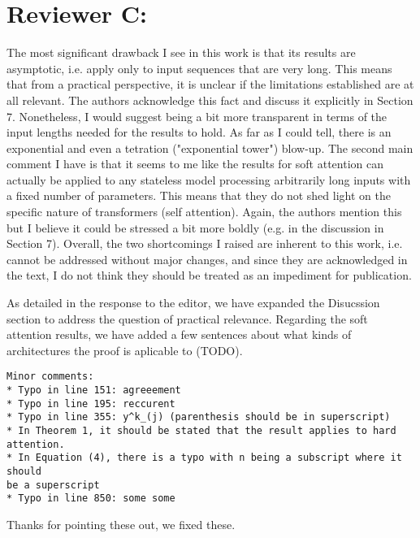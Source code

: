 \documentclass[11pt,a4paper]{article}
\newcommand\response[1]{{\color{blue}#1}}
\begin{document}
\section{Reviewer C:}

The most significant drawback I see in this work is that its results are
asymptotic, i.e. apply only to input sequences that are very long.  This
means that from a practical perspective, it is unclear if the limitations
established are at all relevant.  The authors acknowledge this fact and
discuss it explicitly in Section 7.  Nonetheless, I would suggest being a
bit more transparent in terms of the input lengths needed for the results to
hold.  As far as I could tell, there is an exponential and even a tetration
("exponential tower") blow-up.  The second main comment I have is that it
seems to me like the results for soft attention can actually be applied to
any stateless model processing arbitrarily long inputs with a fixed number
of parameters.  This means that they do not shed light on the specific
nature of transformers (self attention).  Again, the authors mention this
but I believe it could be stressed a bit more boldly (e.g. in the discussion
in Section 7).  Overall, the two shortcomings I raised are inherent to this
work, i.e. cannot be addressed without major changes, and since they are
acknowledged in the text, I do not think they should be treated as an
impediment for publication.

\response{As detailed in the response to the editor, we have expanded the Disucssion section to address the question of practical relevance. Regarding the soft attention results, we have added a few sentences about what kinds of architectures the proof is aplicable to (TODO).}

\begin{verbatim}
Minor comments:
* Typo in line 151: agreeement
* Typo in line 195: reccurent
* Typo in line 355: y^k_(j) (parenthesis should be in superscript)
* In Theorem 1, it should be stated that the result applies to hard
attention.
* In Equation (4), there is a typo with n being a subscript where it should
be a superscript
* Typo in line 850: some some
\end{verbatim}

\response{Thanks for pointing these out, we fixed these.}
\end{document}
